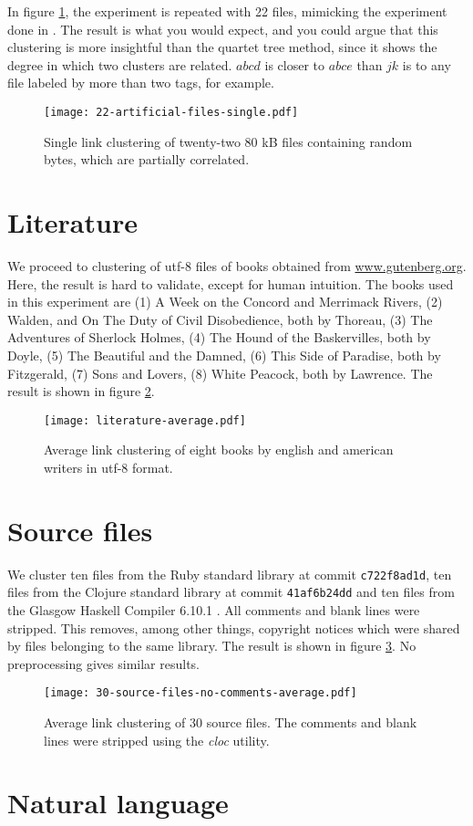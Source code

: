 In figure \ref{figure:22_artificial_files}, the experiment is repeated with 22 files, mimicking the experiment done in \cite{Cilibrasi2005}. The result is what you would expect, and you could argue that this clustering is more insightful than the quartet tree method, since it shows the degree in which two clusters are related. $abcd$ is closer to $abce$ than $jk$ is to any file labeled by more than two tags, for example.

\begin{figure}[h!]
  \texttt{[image: 22-artificial-files-single.pdf]}
  \caption{Single link clustering of twenty-two 80 kB files containing random bytes, which are partially correlated.}
  \label{figure:22_artificial_files}
\end{figure}

\section{Literature}

We proceed to clustering of utf-8 files of books obtained from \url{www.gutenberg.org}. Here, the result is hard to validate, except for human intuition. The books used in this experiment are (1) A Week on the Concord and Merrimack Rivers, (2) Walden, and On The Duty of Civil Disobedience, both by Thoreau, (3) The Adventures of Sherlock Holmes, (4) The Hound of the Baskervilles, both by Doyle, (5) The Beautiful and the Damned, (6) This Side of Paradise, both by Fitzgerald, (7) Sons and Lovers, (8) White Peacock, both by Lawrence. The result is shown in figure \ref{figure:8_books}.

\begin{figure}[h!]
  \texttt{[image: literature-average.pdf]}
  \caption{Average link clustering of eight books by english and american writers in utf-8 format.}
  \label{figure:8_books}
\end{figure}


\section{Source files}

We cluster ten files from the Ruby standard library \cite{ruby} at commit \texttt{c722f8ad1d}, ten files from the Clojure standard library \cite{clojure} at commit \texttt{41af6b24dd} and ten files from the Glasgow Haskell Compiler 6.10.1 \cite{ghc}. All comments and blank lines were stripped. This removes, among other things, copyright notices which were shared by files belonging to the same library. The result is shown in figure \ref{figure:30_source_files}. No preprocessing gives similar results.

\begin{figure}[h!]
  \texttt{[image: 30-source-files-no-comments-average.pdf]}
  \caption{Average link clustering of 30 source files. The comments and blank lines were stripped using the \emph{cloc} utility.}
  \label{figure:30_source_files}
\end{figure}

\section{Natural language}


